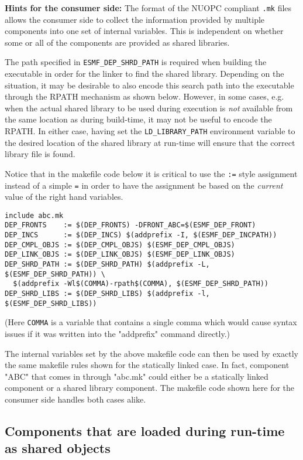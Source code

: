 {\bf Hints for the consumer side:} The format of the NUOPC compliant {\tt .mk} files allows the consumer side to collect the information provided by multiple components into one set of internal variables. This is independent on whether some or all of the components are provided as shared libraries.

The path specified in {\tt ESMF\_DEP\_SHRD\_PATH} is required when building the executable in order for the linker to find the shared library. Depending on the situation, it may be desirable to also encode this search path into the executable through the RPATH mechanism as shown below. However, in some cases, e.g. when the actual shared library to be used during execution is {\em not} available from the same location as during build-time, it may not be useful to encode the RPATH. In either case, having set the {\tt LD\_LIBRARY\_PATH} environment variable to the desired location of the shared library at run-time will ensure that the correct library file is found.

Notice that in the makefile code below it is critical to use the {\tt :=} style assignment instead of a simple {\tt =} in order to have the assignment be based on the {\em current} value of the right hand variables.

\begin{verbatim}
include abc.mk
DEP_FRONTS    := $(DEP_FRONTS) -DFRONT_ABC=$(ESMF_DEP_FRONT)
DEP_INCS      := $(DEP_INCS) $(addprefix -I, $(ESMF_DEP_INCPATH))
DEP_CMPL_OBJS := $(DEP_CMPL_OBJS) $(ESMF_DEP_CMPL_OBJS)
DEP_LINK_OBJS := $(DEP_LINK_OBJS) $(ESMF_DEP_LINK_OBJS)
DEP_SHRD_PATH := $(DEP_SHRD_PATH) $(addprefix -L, $(ESMF_DEP_SHRD_PATH)) \
  $(addprefix -Wl$(COMMA)-rpath$(COMMA), $(ESMF_DEP_SHRD_PATH))
DEP_SHRD_LIBS := $(DEP_SHRD_LIBS) $(addprefix -l, $(ESMF_DEP_SHRD_LIBS))
\end{verbatim}

(Here {\tt COMMA} is a variable that contains a single comma which would cause syntax issues if it was written into the "addprefix" command directly.)

The internal variables set by the above makefile code can then be used by exactly the same makefile rules shown for the statically linked case. In fact, component "ABC" that comes in through "abc.mk" could either be a statically linked component or a shared library component. The makefile code shown here for the consumer side handles both cases alike.

\subsection{Components that are loaded during run-time as shared objects}
\label{StandardCompDep:SharedObject}

